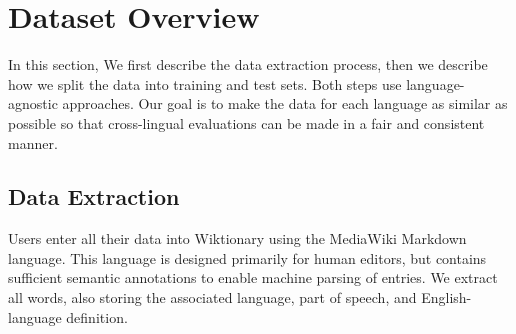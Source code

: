 \documentclass[11pt]{article}
\newcommand{\fixme}[1]{\textbf{FIXME: {#1}}}
\begin{document}
{%
}

\section{Dataset Overview}
\label{sec:dataset}

In this section, We first describe the data extraction process,
then we describe how we split the data into training and test sets.
Both steps use language-agnostic approaches.
Our goal is to make the data for each language as similar as possible so that cross-lingual evaluations can be made in a fair and consistent manner.

\subsection{Data Extraction}

Users enter all their data into Wiktionary using the MediaWiki Markdown language.
This language is designed primarily for human editors,
but contains sufficient semantic annotations to enable machine parsing of entries.
We extract all words, also storing the associated language, part of speech, and English-language definition.

\end{document}
